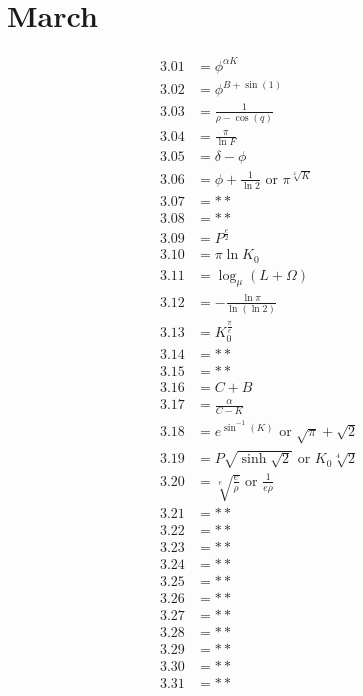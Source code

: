 \documentclass[12pt]{article}
\newcommand{\oder}{\text{ or }}
\begin{document}
\section{March}
\begin{align*}
3.01 &= \phi^{\alpha K}\\
3.02 &= \phi^{B + \sin(1)}\\
3.03 &= \frac{1}{\rho - \cos(q)}\\
3.04 &= \frac{\pi}{\ln F}\\
3.05 &= \delta - \phi\\
3.06 &= \phi + \frac{1}{\ln 2} \oder \pi^{\sqrt[4]{K}}\\
3.07 &= **\\
3.08 &= **\\
3.09 &= P^{\frac{e}{2}}\\
3.10 &= \pi \ln{K_{0}}\\
3.11 &= \log_{\mu}\left(L+\Omega\right)\\
3.12 &= -\frac{\ln \pi}{\ln(\ln 2)}\\
3.13 &= K_{0}^{\frac{\pi}{e}}\\
3.14 &= **\\
3.15 &= **\\
3.16 &= C + B\\
3.17 &= \frac{\alpha}{C - K}\\
3.18 &= e^{\sin^{-1}(K)} \oder \sqrt{\pi} + \sqrt{2}\\
3.19 &= P \sqrt{\sinh\sqrt{2}} \oder K_{0} \sqrt[4]{2}\\
3.20 &= \sqrt[e]{\frac{e}{\rho}} \oder \frac{1}{e \rho}\\
3.21 &= **\\
3.22 &= **\\
3.23 &= **\\
3.24 &= **\\
3.25 &= **\\
3.26 &= **\\
3.27 &= **\\
3.28 &= **\\
3.29 &= **\\
3.30 &= **\\
3.31 &= **\\
\end{align*}

\pagebreak
\end{document}
